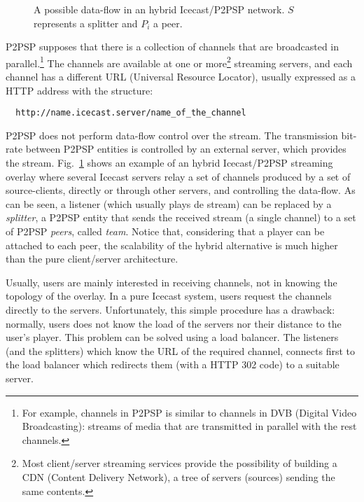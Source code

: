 \label{sec:TTS}

\begin{figure}
   \caption{A possible data-flow in an
  hybrid Icecast/P2PSP network. $S$ represents a splitter and $P_i$ a
  peer.\label{fig:icecast-P2PSP}}
\end{figure}

P2PSP supposes that there is a collection of channels that are
broadcasted in parallel.\footnote{For example, channels in P2PSP is
  similar to channels in DVB (Digital Video Broadcasting): streams of
  media that are transmitted in parallel with the rest channels.} The
channels are available at one or more\footnote{Most client/server
  streaming services provide the possibility of building a CDN
  (Content Delivery Network), a tree of servers (sources) sending the
  same contents.} streaming servers, and each channel has a different
URL (Universal Resource Locator), usually expressed as a HTTP
address with the structure:
\begin{verbatim}
  http://name.icecast.server/name_of_the_channel
\end{verbatim}

P2PSP does not perform data-flow control over the stream. The
transmission bit-rate between P2PSP entities is controlled by an
external server, which provides the
stream. Fig.~\ref{fig:icecast-P2PSP} shows an example of an hybrid
Icecast/P2PSP streaming overlay where several Icecast servers relay a
set of channels produced by a set of source-clients, directly or
through other servers, and controlling the data-flow. As can be seen,
a listener (which usually plays de stream) can be replaced by a
\emph{splitter}, a P2PSP entity that sends the received stream (a
single channel) to a set of P2PSP \emph{peers}, called
\emph{team}. Notice that, considering that a player can be attached to
each peer, the scalability of the hybrid alternative is much higher
than the pure client/server architecture.


Usually, users are mainly interested in receiving channels, not in
knowing the topology of the overlay. In a pure Icecast system, users
request the channels directly to the servers. Unfortunately, this
simple procedure has a drawback: normally, users does not know the
load of the servers nor their distance to the user's player. This
problem can be solved using a load balancer. The listeners (and the
splitters) which know the URL of the required channel, connects first
to the load balancer which redirects them (with a HTTP 302 code) to a
suitable server.

